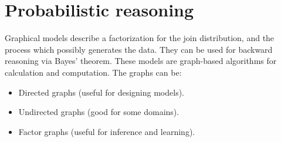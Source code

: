 \documentclass[12pt, a4paper]{report}
\begin{document}
    \section{Probabilistic reasoning}
    Graphical models describe a factorization for the join distribution, and the process which possibly generates the data. They can be used for backward reasoning via Bayes' theorem.
    These models are graph-based algorithms for calculation and computation. The graphs can be: 
    \begin{itemize}
        \item Directed graphs (useful for designing models).
        \item Undirected graphs (good for some domains).
        \item Factor graphs (useful for inference and learning).
    \end{itemize}
\end{document}
